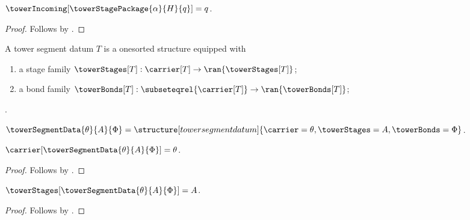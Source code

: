 \begin{proposition}\label{tower_stage_package_structure_incoming}
    $\towerIncoming[\towerStagePackage{\alpha}{H}{q}]=q$.
\end{proposition}
\begin{proof}
    Follows by
        .
\end{proof}

\begin{struct}\label{tower_segment_data}
    A tower segment datum $T$ is a onesorted structure equipped with
    \begin{enumerate}
        \item\label{tower_segment_stage_family}
            a stage family
            $\towerStages[T]:\carrier[T]\to\ran{\towerStages[T]}$;
        \item\label{tower_segment_bond_family}
            a bond family
            $\towerBonds[T]:
                \subseteqrel{\carrier[T]}\to\ran{\towerBonds[T]}$;
    \end{enumerate}.
\end{struct}

\begin{definition}\label{tower_segment_data_structure}
    $\towerSegmentData{\theta}{A}{\Phi}=
        \structure[tower segment datum]{
            \carrier=\theta,
            \towerStages=A,
            \towerBonds=\Phi
        }$.
\end{definition}

\begin{proposition}\label{tower_segment_data_structure_carrier}
    $\carrier[\towerSegmentData{\theta}{A}{\Phi}]=\theta$.
\end{proposition}
\begin{proof}
    Follows by
        .
\end{proof}

\begin{proposition}\label{tower_segment_data_structure_stages}
    $\towerStages[\towerSegmentData{\theta}{A}{\Phi}]=A$.
\end{proposition}
\begin{proof}
    Follows by
        .
\end{proof}

